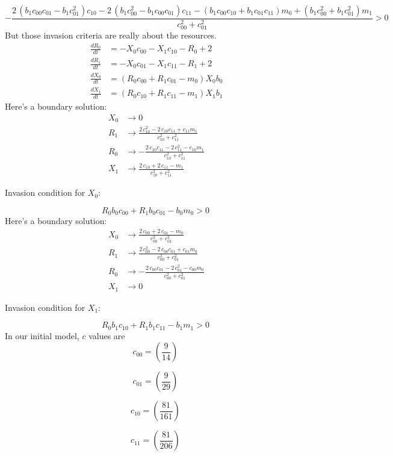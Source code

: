 \documentclass{article}
\begin{document}
\[-\frac{2 \, {\left(b_{1} c_{00} c_{01} - b_{1} c_{01}^{2}\right)} c_{10} - 2 \, {\left(b_{1} c_{00}^{2} - b_{1} c_{00} c_{01}\right)} c_{11} - {\left(b_{1} c_{00} c_{10} + b_{1} c_{01} c_{11}\right)} m_{0} + {\left(b_{1} c_{00}^{2} + b_{1} c_{01}^{2}\right)} m_{1}}{c_{00}^{2} + c_{01}^{2}} > 0 \
\]
But those invasion criteria are really about the resources.
\begin{align*}
\frac{dR_{0}}{dt} &= -X_{0} c_{00} - X_{1} c_{10} - R_{0} + 2\\
\frac{dR_{1}}{dt} &= -X_{0} c_{01} - X_{1} c_{11} - R_{1} + 2\\
\frac{dX_{0}}{dt} &= {\left(R_{0} c_{00} + R_{1} c_{01} - m_{0}\right)} X_{0} b_{0}\\
\frac{dX_{1}}{dt} &= {\left(R_{0} c_{10} + R_{1} c_{11} - m_{1}\right)} X_{1} b_{1}
\end{align*}Here's a boundary solution: \begin{align*}
  X_{0} &\to 0 \\
  R_{1} &\to \frac{2 \, c_{10}^{2} - 2 \, c_{10} c_{11} + c_{11} m_{1}}{c_{10}^{2} + c_{11}^{2}} \\
  R_{0} &\to -\frac{2 \, c_{10} c_{11} - 2 \, c_{11}^{2} - c_{10} m_{1}}{c_{10}^{2} + c_{11}^{2}} \\
  X_{1} &\to \frac{2 \, c_{10} + 2 \, c_{11} - m_{1}}{c_{10}^{2} + c_{11}^{2}}
\end{align*}

Invasion condition for $X_{0}$:

\[R_{0} b_{0} c_{00} + R_{1} b_{0} c_{01} - b_{0} m_{0} > 0 \
\]
Here's a boundary solution: \begin{align*}
  X_{0} &\to \frac{2 \, c_{00} + 2 \, c_{01} - m_{0}}{c_{00}^{2} + c_{01}^{2}} \\
  R_{1} &\to \frac{2 \, c_{00}^{2} - 2 \, c_{00} c_{01} + c_{01} m_{0}}{c_{00}^{2} + c_{01}^{2}} \\
  R_{0} &\to -\frac{2 \, c_{00} c_{01} - 2 \, c_{01}^{2} - c_{00} m_{0}}{c_{00}^{2} + c_{01}^{2}} \\
  X_{1} &\to 0
\end{align*}

Invasion condition for $X_{1}$:

\[R_{0} b_{1} c_{10} + R_{1} b_{1} c_{11} - b_{1} m_{1} > 0 \
\]
In our initial model, $c$ values are
\[c_{00} = \left(\frac{9}{14}\right) \
\]

\[c_{01} = \left(\frac{9}{29}\right) \
\]

\[c_{10} = \left(\frac{81}{161}\right) \
\]

\[c_{11} = \left(\frac{81}{206}\right) \
\]
\end{document}
